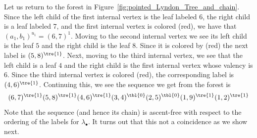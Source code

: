 Let us return to the forest in Figure~\ref{fig:pointed_Lyndon_Tree_and_chain}. Since the left child of the first internal vertex is the leaf labeled 6, the right child is a leaf labeled 7, and the first internal vertex is colored  (red), we have that $(a_1,b_1)^{u_1} = (6,7)^1$. Moving to the second internal vertex we see its left child is the leaf $5$ and the right child is the leaf $8$. Since it is colored by  (red) the next label is $(5,8)^{\tre{1}}$.  Next, moving to the third internal vertex, we see that the left child is a leaf $4$ and the right child is the first internal vertex  whose valency is 6. Since the third internal vertex is colored  (red), the corresponding label is $(4,6)^{\tre{1}}$.   Continuing this, we see the sequence we get from the forest is 
$$
(6,7)^{\tre{1}} (5,8)^{\tre{1}} (4,6)^{\tre{1}}  (3,4)^{\tbl{0}} (2,5)^{\tbl{0}} (1,9)^{\tre{1}} (1,2)^{\tre{1}}
$$
 Note that the sequence (and hence its chain) is ascent-free with respect to the ordering of the labels for $\lambda_\bullet$.   It turns out that this not a coincidence as we show next.
